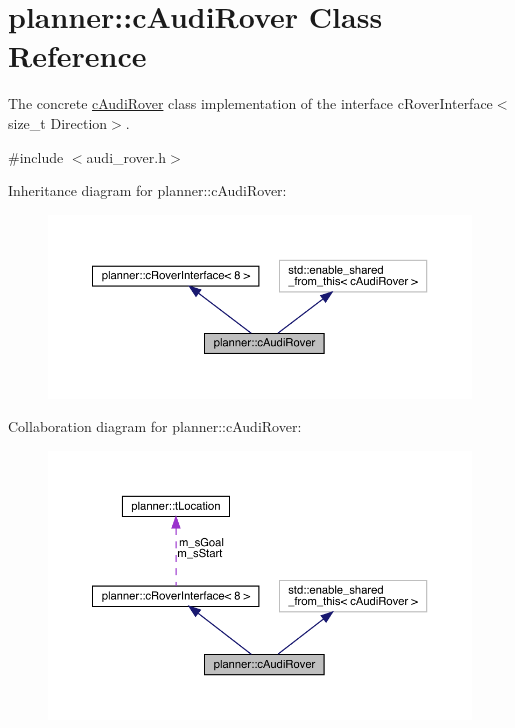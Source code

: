 \hypertarget{classplanner_1_1c_audi_rover}{}\section{planner\+:\+:c\+Audi\+Rover Class Reference}
\label{classplanner_1_1c_audi_rover}


The concrete \mbox{\hyperlink{classplanner_1_1c_audi_rover}{c\+Audi\+Rover}} class implementation of the interface c\+Rover\+Interface$<$size\+\_\+t Direction$>$.  




{\ttfamily \#include $<$audi\+\_\+rover.\+h$>$}



Inheritance diagram for planner\+:\+:c\+Audi\+Rover\+:
\nopagebreak
\begin{figure}[H]
\begin{center}
\leavevmode
\includegraphics[width=350pt]{classplanner_1_1c_audi_rover__inherit__graph}
\end{center}
\end{figure}


Collaboration diagram for planner\+:\+:c\+Audi\+Rover\+:
\nopagebreak
\begin{figure}[H]
\begin{center}
\leavevmode
\includegraphics[width=350pt]{classplanner_1_1c_audi_rover__coll__graph}
\end{center}
\end{figure}
